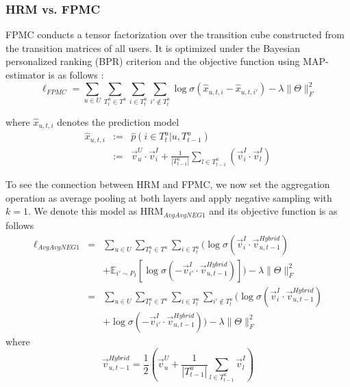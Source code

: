 \documentclass[10pt,journal,compsoc]{IEEEtran}
\begin{document}
\subsubsection{HRM vs. FPMC}
FPMC conducts a tensor factorization over the transition cube constructed from the transition matrices of all users. It is optimized under the Bayesian personalized ranking (BPR) criterion and the objective function using MAP-estimator is as follows \cite{fpmc}:
\begin{equation}\label{eq:fpmcloss}
\!\!\ell_{FPMC}\!=\!\!\!\sum_{u\in U}\!\sum_{T^u_t\in T^u}\!\sum_{i\in T^u_t}\!\sum_{i'\not\in T^u_t}\!\log\sigma(\hat{x}_{u,t,i}-\hat{x}_{u,t,i'}) -\!\!\lambda\!\!\parallel\!\!\Theta\!\!\parallel^2_F
\end{equation}

where $\hat{x}_{u,t,i}$ denotes the prediction model
\begin{eqnarray}\label{eq:hat}
    \hat{x}_{u,t,i} &:=& \hat{p}(i\in T^u_t|u,T^u_{t-1})\nonumber\\
    &:=&\vec{v}^U_u\cdot\vec{v}^I_i+\frac{1}{|T^u_{t-1}|}\sum_{l\in T^u_{t-1}}(\vec{v}^I_i\cdot\vec{v}^I_l)
\end{eqnarray}

To see the connection between HRM and FPMC, we now set the aggregation operation as average pooling at both layers and apply negative sampling with $k=1$. We denote this model as HRM$_{AvgAvgNEG1}$ and its objective function is as follows
\begin{eqnarray}\label{eq:avgavgneg1}
  \ell_{AvgAvgNEG1} &=& \sum_{u\in U}\sum_{T^u_t\in T^u} \sum_{i\in T^u_t}\Big( \log\sigma(\vec{v}^I_i\cdot\vec{v}^{Hybrid}_{u,t-1})\nonumber\\
        &&+\mathbb{E}_{i'\sim P_I}[\log\sigma(-\vec{v}^I_{i'}\cdot\vec{v}^{Hybrid}_{u,t-1})]\Big) -\lambda\|\Theta\|^2_F\nonumber\\
        &=& \sum_{u\in U}\sum_{T^u_t\in T^u} \sum_{i\in T^u_t}\sum_{i'\not\in T^u_t}\Big( \log\sigma(\vec{v}^I_i\cdot\vec{v}^{Hybrid}_{u,t-1})\nonumber\\
        &&+\log\sigma(-\vec{v}^I_{i'}\cdot\vec{v}^{Hybrid}_{u,t-1})\Big) -\lambda\|\Theta\|^2_F
\end{eqnarray}
where
\begin{equation}\label{eq:agg}
\vec{v}^{Hybrid}_{u,t-1}=\frac{1}{2}(\vec{v}^U_u+\frac{1}{|T^u_{t-1}|}\sum_{l\in T^u_{t-1}}\vec{v}^I_l)
\end{equation}
\end{document}
